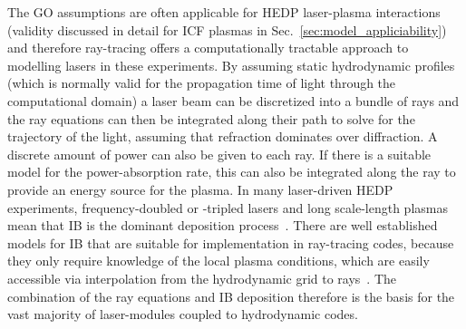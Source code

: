 The \ac{GO} assumptions are often applicable for \ac{HEDP} laser-plasma interactions (validity discussed in detail for \ac{ICF} plasmas in Sec.~\ref{sec:model_appliciability}) and therefore ray-tracing offers a computationally tractable approach to modelling lasers in these experiments.
By assuming static hydrodynamic profiles (which is normally valid for the propagation time of light through the computational domain) a laser beam can be discretized into a bundle of rays and the ray equations can then be integrated along their path to solve for the trajectory of the light, assuming that refraction dominates over diffraction.
A discrete amount of power can also be given to each ray.
If there is a suitable model for the power-absorption rate, this can also be integrated along the ray to provide an energy source for the plasma.
In many laser-driven \ac{HEDP} experiments, frequency-doubled or -tripled lasers and long scale-length plasmas mean that \ac{IB} is the dominant deposition process~\cite{schmitt_importance_2023,schmitt_importance_2023-1}.
There are well established models for \ac{IB} that are suitable for implementation in ray-tracing codes, because they only require knowledge of the local plasma conditions, which are easily accessible via interpolation from the hydrodynamic grid to rays~\cite{huba_nrl_2013,johnston_correct_1973}.
The combination of the ray equations and \ac{IB} deposition therefore is the basis for the vast majority of laser-modules coupled to hydrodynamic codes.

